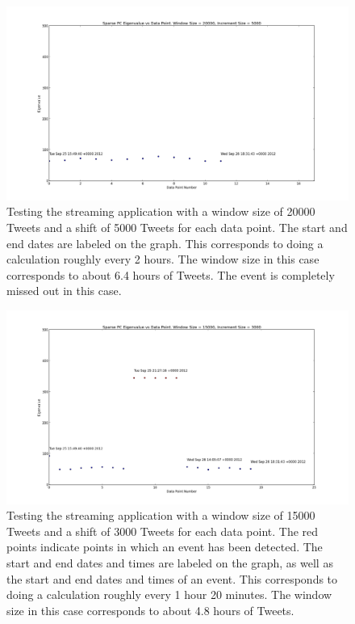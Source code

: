\documentclass[11pt,a4paper]{article}
\begin{document}
\begin{figure}[H]
\centering
\includegraphics[scale=0.25]{Testing_Streaming_App_20000_5000.png}
\caption{Testing the streaming application with a window size of 20000 Tweets and a shift of 5000 Tweets for each data point. The start and end dates are labeled on the graph. This corresponds to doing a calculation roughly every 2 hours. The window size in this case corresponds to about 6.4 hours of Tweets. The event is completely missed out in this case. }
\label{testing_app_20000}
\end{figure}

\begin{figure}[H]
\centering
\includegraphics[scale=0.25]{Testing_Streaming_App_15000_3000.png}
\caption{Testing the streaming application with a window size of 15000 Tweets and a shift of 3000 Tweets for each data point. The red points indicate points in which an event has been detected. The start and end dates and times are labeled on the graph, as well as the start and end dates and times of an event. This corresponds to doing a calculation roughly every 1 hour 20 minutes. The window size in this case corresponds to about 4.8 hours of Tweets.}
\label{testing_app_15000}
\end{figure}
\end{document}
